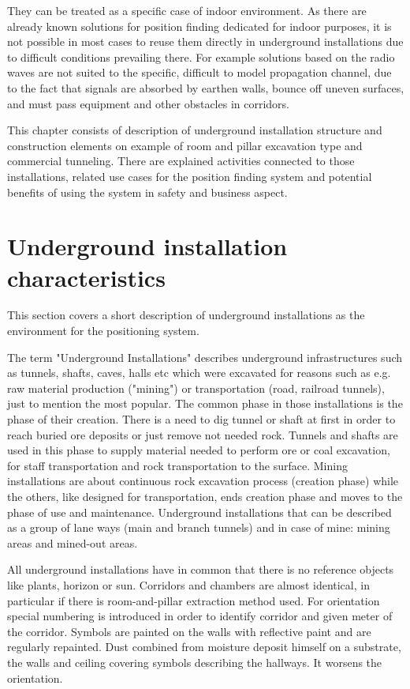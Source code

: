 \documentclass[../main.tex]{subfiles}
\begin{document}
They can be treated as a specific case of indoor environment. As there are already known solutions for position finding dedicated for indoor purposes, it is not possible in most cases to reuse them directly in underground installations due to difficult conditions prevailing there. For example solutions based on the radio waves are not suited to the specific, difficult to model propagation channel, due to the fact that signals are absorbed by earthen walls, bounce off uneven surfaces, and must pass equipment and other obstacles in corridors.

This chapter consists of description of underground installation structure and construction elements on example of room and pillar excavation type and commercial tunneling. There are explained activities connected to those installations, related use cases for the position finding system and potential benefits of using the system in safety and business aspect.

\section{Underground installation characteristics}

This section covers a short description of underground installations as the environment for the positioning system.

The term "Underground Installations" describes underground infrastructures such as tunnels, shafts, caves, halls etc which were excavated for reasons such as e.g. raw material production ("mining") or transportation (road, railroad tunnels), just to mention the most popular. The common phase in those installations is the phase of their creation. There is a need to dig tunnel or shaft at first in order to reach buried ore deposits or just remove not needed rock. Tunnels and shafts are used in this phase to supply material needed to perform ore or coal excavation, for staff transportation and rock transportation to the surface. Mining installations are about continuous rock excavation process (creation phase) while the others, like designed for transportation, ends creation phase and moves to the phase of use and maintenance. Underground installations that can be described as a group of lane ways (main and branch tunnels) and in case of mine: mining areas and mined-out areas.

All underground installations have in common that there is no reference objects like plants, horizon or sun. Corridors and chambers are almost identical, in particular if there is room-and-pillar extraction method used. For orientation special numbering is introduced in order to identify corridor and given meter of the corridor. Symbols are painted on the walls with reflective paint and are regularly repainted. Dust combined from moisture deposit himself on a substrate, the walls and ceiling covering symbols describing the hallways. It worsens the orientation.
\end{document}
